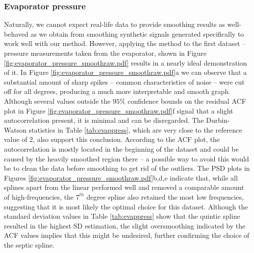 \documentclass[11pt,leqno]{book}
\theoremstyle{definition}
\theoremstyle{plain}
\theoremstyle{definition}
\begin{document}
{\subsubsection{Evaporator pressure}
Naturally, we cannot expect real-life data to provide smoothing results as well-behaved as we obtain from smoothing synthetic signals generated specifically to work well with our method. However, applying the method to the first dataset -- pressure measurements taken from the evaporator, shown in Figure \ref{fig:evaporator_pressure_smoothraw.pdf} results in a nearly ideal demonstration of it. In Figure \ref{fig:evaporator_pressure_smoothraw.pdf}a we can observe that a substantial amount of sharp spikes -- common characteristics of noise -- were cut off for all degrees, producing a much more interpretable and smooth graph. Although several values outside the $95\%$ confidence bounds on the residual ACF plot in Figure \ref{fig:evaporator_pressure_smoothraw.pdf}f signal that a slight autocorrelation present, it is minimal and can be disregarded. The Durbin-Watson statistics in Table \ref{tab:evappress}, which are very close to the reference value of 2, also support this conclusion. According to the ACF plot, the autocorrelation is mostly located in the beginning of the dataset and could be caused by the heavily smoothed region there -- a possible way to avoid this would be to clean the data before smoothing to get rid of the outliers. The PSD plots in Figures \ref{fig:evaporator_pressure_smoothraw.pdf}b,d,e indicate that, while all splines apart from the linear performed well and removed a comparable amount of high-frequencies, the $7^{th}$ degree spline also retained the most low frequencies, suggesting that it is most likely the optimal choice for this dataset. Although the standard deviation values in Table \ref{tab:evappress} show that the quintic spline resulted in the highest SD estimation, the slight oversmoothing indicated by the ACF values implies that this might be undesired, further confirming the choice of the septic spline.


}
\end{document}
